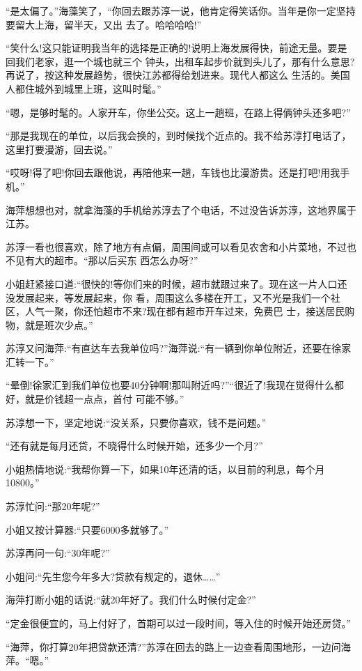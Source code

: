 \documentclass[11pt,a4paper,onecolumn]{article}
\begin{document}
``是太偏了。''海藻笑了，``你回去跟苏淳一说，他肯定得笑话你。当年是你一定坚持要留大上海，留半天，又出
去了。哈哈哈哈!''

``笑什么!这只能证明我当年的选择是正确的!说明上海发展得快，前途无量。要是回我们老家，逛一个城也就三个
钟头，出租车起步价就到头儿了，那有什么意思?再说了，按这种发展趋势，很快江苏都得给划进来。现代人都这么
生活的。美国人都住城外到城里上班，这叫时髦。''

``嗯，是够时髦的。人家开车，你坐公交。这上一趟班，在路上得俩钟头还多吧?''

``那是我现在的单位，以后我会换的，到时候找个近点的。我不给苏淳打电话了，这里打要漫游，回去说。''

``哎呀!得了吧!你回去跟他说，再陪他来一趟，车钱也比漫游贵。还是打吧!用我手机。''

海萍想想也对，就拿海藻的手机给苏淳去了个电话，不过没告诉苏淳，这地界属于江苏。

苏淳一看也很喜欢，除了地方有点偏，周围间或可以看见农舍和小片菜地，不过也不见有大的超市。``那以后买东
西怎么办呀?''

小姐赶紧接口道:``很快的!等你们来的时候，超市就跟过来了。现在这一片人口还没发展起来，等发展起来，你
看，周围这么多楼在开工，又不光是我们一个社区，人气一聚，你还怕超市不来?现在都有超市开车过来，免费巴
士，接送居民购物，就是班次少点。''

苏淳又问海萍:``有直达车去我单位吗?''海萍说:``有一辆到你单位附近，还要在徐家汇转一下。''

``晕倒!徐家汇到我们单位也要40分钟啊!那叫附近吗?''``很近了!我现在觉得什么都好，就是价钱超一点点，首付
可能不够。''

苏淳想一下，坚定地说:``没关系，只要你喜欢，钱不是问题。''

``还有就是每月还贷，不晓得什么时候开始，还多少一个月?''

小姐热情地说:``我帮你算一下，如果10年还清的话，以目前的利息，每个月10800。''

苏淳忙问:``那20年呢?''

小姐又按计算器:``只要6000多就够了。''

苏淳再问一句:``30年呢?''

小姐问:``先生您今年多大?贷款有规定的，退休……''

海萍打断小姐的话说:``就20年好了。我们什么时候付定金?''

``定金很便宜的，马上付好了，首期可以过一段时间，等入住的时候开始还房贷。''

``海萍，你打算20年把贷款还清?''苏淳在回去的路上一边查看周围地形，一边问海萍。``嗯。''
\end{document}
